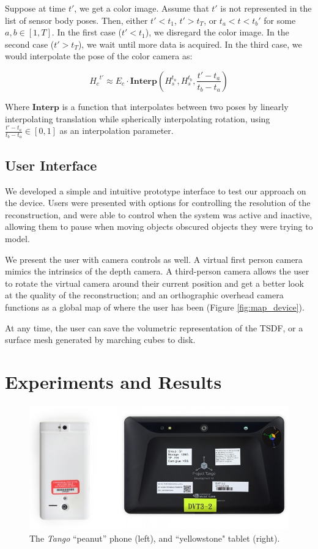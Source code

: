 \documentclass[conference,10pt]{IEEEtran}
\begin{document}
Suppose at time $t'$, we get a color image. Assume that $t'$ is not represented
in the list of sensor body poses. Then, either $t' < t_1$,  $t' > t_T$, or
$t_a < t < t_b'$ for some $a, b \in [1, T]$. In the first case ($t' < t_1$), we
disregard the color image. In the second case ($t' > t_T$), we wait until more data is
acquired. In the third case, we would interpolate the pose of the color camera
as:

$$ {H_{c}}^{t'} \approx E_c \cdot \textbf{Interp}\left(H_{s}^{t_a}, H_{s}^{t_b},
\frac{t' - t_a}{t_b - t_a}\right) $$

Where $\textbf{Interp}$ is a function that  interpolates between two
poses by linearly interpolating translation while spherically interpolating
rotation, using $\frac{t' - t_a}{t_b - t_a} \in [0, 1]$ as an interpolation
parameter. 

\subsection{User Interface}
We developed a simple and intuitive prototype interface to test our approach on
the device. Users were presented with options for controlling the resolution of
the reconstruction, and were able to control when the system was active and
inactive, allowing them to pause when moving objects obscured objects they were
trying to model.

We present the user with camera controls as well. A virtual first person
camera mimics the intrinsics of the depth camera. A third-person camera allows
the user to rotate the virtual camera around their current position and get a
better look at the quality of the reconstruction; and an orthographic overhead
camera functions as a global map of where the user has been (Figure
\ref{fig:map_device}).

At any time, the user can save the volumetric representation of the TSDF, or a
surface mesh generated by marching cubes to disk.

\section{Experiments and Results}
\begin{figure}
  \centering
    \includegraphics[width=1.0\columnwidth]{img/devices}
      \caption{The \textit{Tango}\cite{Tango} ``peanut'' phone (left), and
      ``yellowstone" tablet (right).}
  \label{fig:devices}
\end{figure}
\end{document}
